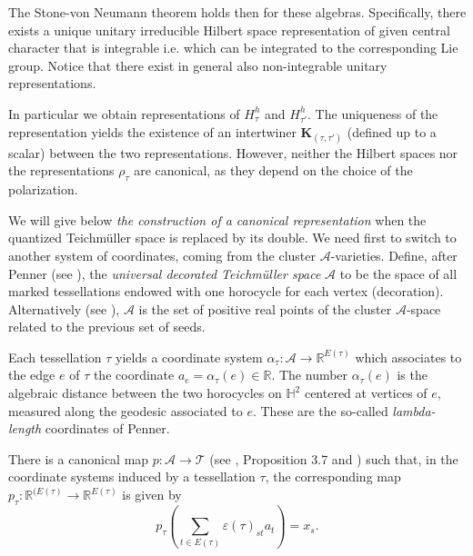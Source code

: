 \documentclass[twoside]{irmaems}
\theoremstyle{plain}
\theoremstyle{definition}
\theoremstyle{remark}
\newcommand{\R}{{\mathbb{R}}}
\begin{document}
\vspace{0.2cm}
\noindent 
The Stone-von Neumann theorem holds then for these algebras. 
Specifically, there exists a unique unitary irreducible Hilbert space representation 
of given central character that is integrable i.e. which can be integrated to the 
corresponding Lie group. Notice that  there exist in general also 
non-integrable unitary representations. 

\vspace{0.2cm}
\noindent 
In particular we obtain representations of $H_{\tau}^h$ and  $H_{\tau'}^h$. 
The uniqueness of the representation yields the existence of  an intertwiner ${\mathbf K}_{(\tau,\tau')}$
(defined up to a scalar) between the two representations. 
However,  neither the Hilbert spaces nor the representations $\rho_{\tau}$ are 
canonical, 
as they depend on the choice of the polarization. 


\vspace{0.2cm}
\noindent 
We will give below {\em the construction of a canonical representation} when
the quantized Teichm\"uller space  is replaced by its double. 
We need first to switch to another system of coordinates, 
coming from the cluster  ${\mathcal A}$-varieties. 
Define, after Penner (see \cite{pe0}),  
the  {\em universal decorated Teichm\"uller space} ${\mathcal A}$ to be the space 
of all marked tessellations endowed with one horocycle for each vertex (decoration).   
Alternatively (see \cite{FG1}), 
${\mathcal A}$ is the set of positive real points of the 
cluster ${\mathcal A}$-space related to the previous set of seeds. 

\vspace{0.2cm}
\noindent 
Each tessellation $\tau$  yields a coordinate system 
$\alpha_{\tau}:{\mathcal A}\to \R^{E(\tau)}$ which associates to the edge 
$e$ of $\tau$ the coordinate $a_e=\alpha_{\tau}(e)\in \R$. 
The number $\alpha_{\tau}(e)$  is the algebraic distance between 
the two horocycles on ${\mathbb H}^2$ centered at vertices of $e$, 
measured along the geodesic associated to $e$.  These are the so-called {\em lambda-length} 
coordinates of Penner. 

\vspace{0.2cm}
\noindent 
There is a canonical  map $p:{\mathcal A}\to {\mathcal T}$  (see \cite{pe0}, Proposition 3.7 and 
\cite{FG1}) 
such that, in the coordinate systems induced by a tessellation $\tau$, the corresponding map 
$p_{\tau} :\R^{(E(\tau)}\to \R^{E(\tau)}$ is given by 
\[ p_{\tau}\left(\sum_{t\in E(\tau)} \varepsilon(\tau)_{st}a_t\right)=x_s.\]
\end{document}
